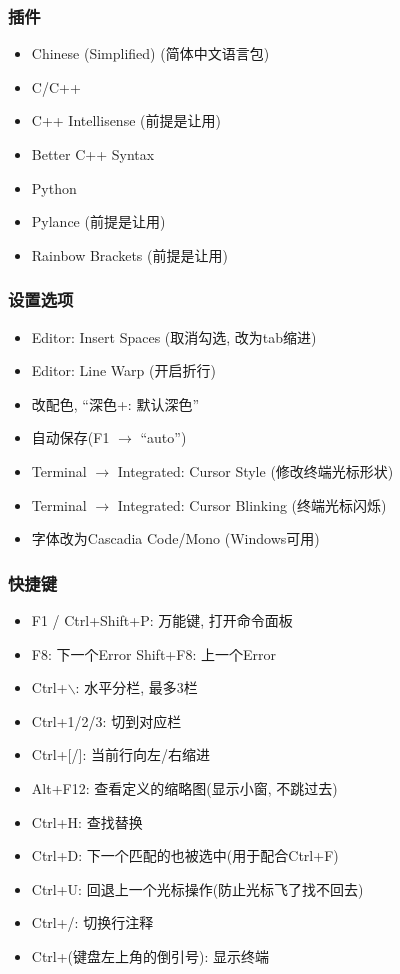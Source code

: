 \subsubsection{插件}

\begin{itemize}
	\item Chinese (Simplified) (简体中文语言包)
	\item C/C++
	\item C++ Intellisense (前提是让用)
	\item Better C++ Syntax
	\item Python
	\item Pylance (前提是让用)
	\item Rainbow Brackets (前提是让用)
\end{itemize}

\subsubsection{设置选项}

\begin{itemize}
	\item Editor: Insert Spaces (取消勾选, 改为tab缩进)
	\item Editor: Line Warp (开启折行)
	\item 改配色, ``深色+: 默认深色''
	\item 自动保存(F1 $\rightarrow$ ``auto'')
	\item Terminal $\to$ Integrated: Cursor Style (修改终端光标形状)
	\item Terminal $\to$ Integrated: Cursor Blinking (终端光标闪烁)
	\item 字体改为Cascadia Code/Mono (Windows可用)
\end{itemize}

\subsubsection{快捷键}

\begin{itemize}
	\item F1 / Ctrl+Shift+P: 万能键, 打开命令面板
	\item F8: 下一个Error \quad Shift+F8: 上一个Error
	\item Ctrl+$\backslash$: 水平分栏, 最多3栏
	\item Ctrl+1/2/3: 切到对应栏
	\item Ctrl+[/]: 当前行向左/右缩进
	\item Alt+F12: 查看定义的缩略图(显示小窗, 不跳过去)
	\item Ctrl+H: 查找替换
	\item Ctrl+D: 下一个匹配的也被选中(用于配合Ctrl+F)
	\item Ctrl+U: 回退上一个光标操作(防止光标飞了找不回去)
	\item Ctrl+/: 切换行注释
	\item Ctrl+(键盘左上角的倒引号): 显示终端
\end{itemize}